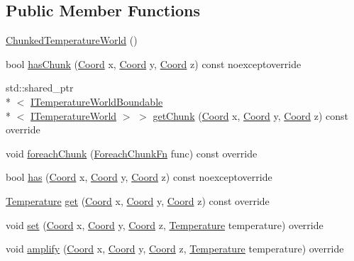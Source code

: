 \subsection*{Public Member Functions}
\begin{DoxyCompactItemize}
\item 
\hyperlink{class_chunked_temperature_world_a9c60a8c8964e67556cc51a046f0cb42f}{Chunked\-Temperature\-World} ()
\item 
bool \hyperlink{class_chunked_temperature_world_aa06bb1517a6ba6537a89992a8a2f4d8e}{has\-Chunk} (\hyperlink{struct_coord}{Coord} x, \hyperlink{struct_coord}{Coord} y, \hyperlink{struct_coord}{Coord} z) const noexceptoverride
\item 
std\-::shared\-\_\-ptr\\*
$<$ \hyperlink{class_i_temperature_world_boundable}{I\-Temperature\-World\-Boundable}\\*
$<$ \hyperlink{class_i_temperature_world}{I\-Temperature\-World} $>$ $>$ \hyperlink{class_chunked_temperature_world_a9b925259d18aecbde683048ee0422d72}{get\-Chunk} (\hyperlink{struct_coord}{Coord} x, \hyperlink{struct_coord}{Coord} y, \hyperlink{struct_coord}{Coord} z) const override
\item 
void \hyperlink{class_chunked_temperature_world_ab737084e5879c35044c34012fd2281b3}{foreach\-Chunk} (\hyperlink{class_i_temperature_world_chunkable_mixin_a9454e8c3813367f13da22c894c1052ed}{Foreach\-Chunk\-Fn} func) const override
\item 
bool \hyperlink{class_chunked_temperature_world_a05f4ce24ff44a6f4f17a8aac71f78af0}{has} (\hyperlink{struct_coord}{Coord} x, \hyperlink{struct_coord}{Coord} y, \hyperlink{struct_coord}{Coord} z) const noexceptoverride
\item 
\hyperlink{struct_temperature}{Temperature} \hyperlink{class_chunked_temperature_world_a9b57de410490bd8f5d6bc69d09d6b97c}{get} (\hyperlink{struct_coord}{Coord} x, \hyperlink{struct_coord}{Coord} y, \hyperlink{struct_coord}{Coord} z) const override
\item 
void \hyperlink{class_chunked_temperature_world_a97210f06e70f9ea07a4b284963e610e1}{set} (\hyperlink{struct_coord}{Coord} x, \hyperlink{struct_coord}{Coord} y, \hyperlink{struct_coord}{Coord} z, \hyperlink{struct_temperature}{Temperature} temperature) override
\item 
void \hyperlink{class_chunked_temperature_world_af4d90e4910f2197691f2c08f11cbc657}{amplify} (\hyperlink{struct_coord}{Coord} x, \hyperlink{struct_coord}{Coord} y, \hyperlink{struct_coord}{Coord} z, \hyperlink{struct_temperature}{Temperature} temperature) override

\end{DoxyCompactItemize}
